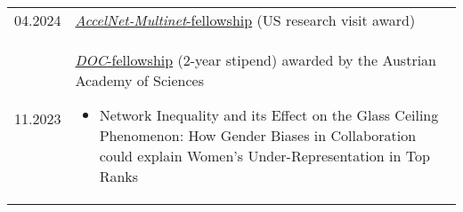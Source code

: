 
\begin{longtable}[l]{@{}p{} p{}}
    04.2024 & \href{https://www.accelnet-multinet.org/}{\emph{AccelNet-Multinet}-fellowship} (US research visit award)\\
    11.2023 & \href{https://stipendien.oeaw.ac.at/en/fellowships/doc}{\emph{DOC}-fellowship} (2-year stipend) awarded by the Austrian Academy of Sciences
    \begin{itemize}
        \item Network Inequality and its Effect on the Glass Ceiling Phenomenon: How Gender Biases in Collaboration could explain Women’s Under-Representation in Top Ranks
    \end{itemize}

\end{longtable}
